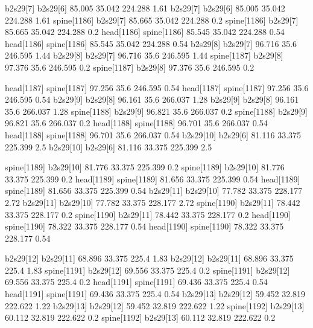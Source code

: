 b2s29[7]    b2s29[6]    85.005    35.042    224.288    1.61
b2s29[7]    b2s29[6]    85.005    35.042    224.288    1.61
spine[1186]    b2s29[7]    85.665    35.042    224.288    0.2
spine[1186]    b2s29[7]    85.665    35.042    224.288    0.2
head[1186]    spine[1186]    85.545    35.042    224.288    0.54
head[1186]    spine[1186]    85.545    35.042    224.288    0.54
b2s29[8]    b2s29[7]    96.716    35.6    246.595    1.44
b2s29[8]    b2s29[7]    96.716    35.6    246.595    1.44
spine[1187]    b2s29[8]    97.376    35.6    246.595    0.2
spine[1187]    b2s29[8]    97.376    35.6    246.595    0.2


head[1187]    spine[1187]    97.256    35.6    246.595    0.54
head[1187]    spine[1187]    97.256    35.6    246.595    0.54
b2s29[9]    b2s29[8]    96.161    35.6    266.037    1.28
b2s29[9]    b2s29[8]    96.161    35.6    266.037    1.28
spine[1188]    b2s29[9]    96.821    35.6    266.037    0.2
spine[1188]    b2s29[9]    96.821    35.6    266.037    0.2
head[1188]    spine[1188]    96.701    35.6    266.037    0.54
head[1188]    spine[1188]    96.701    35.6    266.037    0.54
b2s29[10]    b2s29[6]    81.116    33.375    225.399    2.5
b2s29[10]    b2s29[6]    81.116    33.375    225.399    2.5


spine[1189]    b2s29[10]    81.776    33.375    225.399    0.2
spine[1189]    b2s29[10]    81.776    33.375    225.399    0.2
head[1189]    spine[1189]    81.656    33.375    225.399    0.54
head[1189]    spine[1189]    81.656    33.375    225.399    0.54
b2s29[11]    b2s29[10]    77.782    33.375    228.177    2.72
b2s29[11]    b2s29[10]    77.782    33.375    228.177    2.72
spine[1190]    b2s29[11]    78.442    33.375    228.177    0.2
spine[1190]    b2s29[11]    78.442    33.375    228.177    0.2
head[1190]    spine[1190]    78.322    33.375    228.177    0.54
head[1190]    spine[1190]    78.322    33.375    228.177    0.54


b2s29[12]    b2s29[11]    68.896    33.375    225.4    1.83
b2s29[12]    b2s29[11]    68.896    33.375    225.4    1.83
spine[1191]    b2s29[12]    69.556    33.375    225.4    0.2
spine[1191]    b2s29[12]    69.556    33.375    225.4    0.2
head[1191]    spine[1191]    69.436    33.375    225.4    0.54
head[1191]    spine[1191]    69.436    33.375    225.4    0.54
b2s29[13]    b2s29[12]    59.452    32.819    222.622    1.22
b2s29[13]    b2s29[12]    59.452    32.819    222.622    1.22
spine[1192]    b2s29[13]    60.112    32.819    222.622    0.2
spine[1192]    b2s29[13]    60.112    32.819    222.622    0.2


